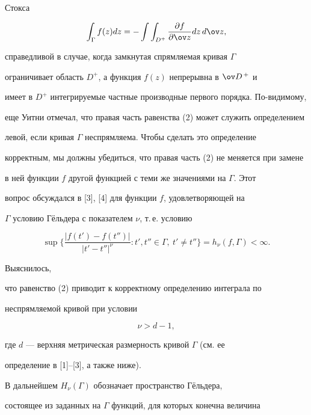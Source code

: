Стокса


\begin{equation}


\int_{\Gamma}f(z)dz = -\int\int_{D^+}


\frac{\partial f}{\partial\ov z}dz\,d\ov z,


\end{equation}


справедливой в случае, когда замкнутая спрямляемая кривая $\Gamma$


ограничивает область $D^+$, а функция $f(z)$ непрерывна в $\ov D^{\,+}$ и


имеет в $D^+$ интегрируемые частные производные первого порядка. По-видимому,


еще Уитни отмечал, что правая часть равенства (2) может служить определением


левой, если кривая $\Gamma$ неспрямляема. Чтобы сделать это определение


корректным, мы должны убедиться, что правая часть (2) не меняется при замене


в ней функции $f$ другой функцией с теми же значениями на $\Gamma$. Этот


вопрос обсуждался в [3], [4] для функции $f$, удовлетворяющей на


$\Gamma$ условию Г\"ельдера с показателем $\nu$, т.\,е. условию


$$


\sup\bigg \{\frac{| f(t')-f(t'')|}{| t'-t''|^{\nu}}


: t',t''\in \Gamma,\ t'\ne t''\bigg\}=h_{\nu}(f,\Gamma)<\infty.


$$


Выяснилось,


что равенство (2) приводит к корректному определению интеграла по


неспрямляемой кривой при условии


\begin{equation}


\nu > d - 1,


\end{equation}


где $d$ --- верхняя метрическая размерность кривой $\Gamma$ (см. ее


определение в [1]--[3], а также ниже).





В дальнейшем $H_{\nu}(\Gamma)$ обозначает пространство Г\"ельдера,


состоящее из заданных на $\Gamma$ функций, для которых конечна величина


